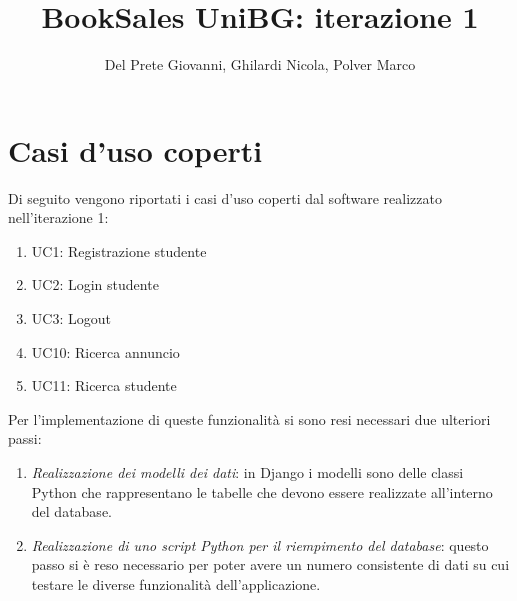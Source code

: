 \documentclass[10pt,a4paper]{report}
\author{Del Prete Giovanni, Ghilardi Nicola, Polver Marco}
\title{BookSales UniBG: iterazione 1}
\begin{document}
	
	\maketitle
	\tableofcontents
	
	\section{Casi d'uso coperti}
	Di seguito vengono riportati i casi d'uso coperti dal software realizzato nell'iterazione 1:
	\begin{enumerate}
		\item UC1: Registrazione studente
		\item UC2: Login studente
		\item UC3: Logout
		\item UC10: Ricerca annuncio
		\item UC11: Ricerca studente
	\end{enumerate}
	Per l'implementazione di queste funzionalità si sono resi necessari due ulteriori passi:
	\begin{enumerate}
		\item \textit{Realizzazione dei modelli dei dati}: in Django i modelli sono delle classi Python che rappresentano le tabelle che devono essere realizzate all'interno del database.
		\item \textit{Realizzazione di uno script Python per il riempimento del database}: questo passo si è reso necessario per poter avere un numero consistente di dati su cui testare le diverse funzionalità dell'applicazione.
	\end{enumerate}
\end{document}
